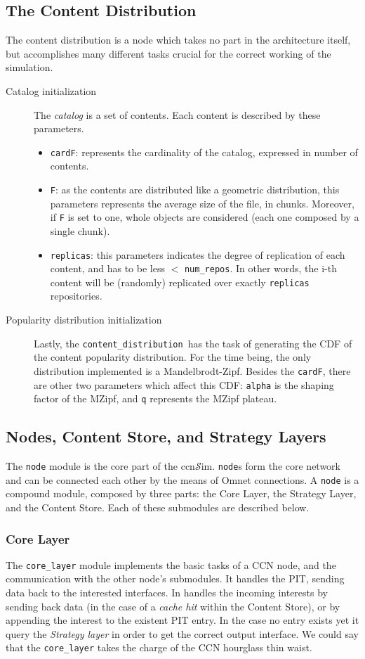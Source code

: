 \documentclass{article}
\newcommand{\ccnsim}{ccn$\mathcal{S}$im}
\newcommand{\content}{\texttt{content\_distribution}}
\begin{document}
\subsection{The Content Distribution}
The content distribution is a node which takes no part in the architecture itself, but accomplishes many different tasks crucial for the correct working of the simulation. 
\begin{description}
    \item[Catalog initialization] The \emph{catalog} is a set of contents. Each content is described by these parameters.
	\begin{itemize}
	    \item \verb|cardF|: represents the cardinality of the catalog, expressed in number of contents. 
	    \item \verb|F|: as the contents are distributed like a geometric distribution, this parameters represents the average size of the file, in chunks. Moreover, if \verb|F| is set to one, whole objects are considered (each one composed by a single chunk).
	    \item \verb|replicas|: this parameters indicates the degree of replication of each content, and has to be less $<$ \verb|num_repos|. In other words, the i-th content will be (randomly) replicated over exactly \verb|replicas| repositories.
	\end{itemize}
    \item[Popularity distribution initialization] Lastly, the \content\ has the task of generating the CDF of the content popularity distribution. For the time being, the only distribution implemented is a Mandelbrodt-Zipf. Besides the \verb|cardF|, there are other two parameters which affect this CDF: \verb|alpha| is the shaping factor of the MZipf, and \verb|q| represents the MZipf plateau.
\end{description}

\subsection{Nodes, Content Store, and Strategy Layers}
The \verb|node| module is the core part of the \ccnsim. \verb|node|s form the core network and can be connected each other by the means of Omnet connections. A \verb|node| is a compound module, composed by three parts: the Core Layer, the Strategy Layer, and the Content Store. Each of these submodules are  described below. 
\subsubsection{Core Layer} 
The \verb|core_layer| module implements the basic tasks of a CCN node, and the communication with the other node's submodules. It handles the PIT, sending data back to the interested interfaces. In handles the incoming interests by sending back data (in the case of a \emph{cache hit} within the Content Store), or by  appending the interest to the existent PIT entry. In the case no entry exists yet it query  the \emph{Strategy layer} in order to get the correct output interface. We could say that the \verb|core_layer| takes the charge of the CCN hourglass  thin waist.
\end{document}
